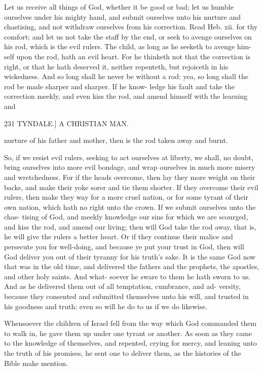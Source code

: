 \documentclass{custom}
\begin{document}
{Let us receive all things of God, whether it be good or 
bad; let us humble ourselves under his mighty hand, and 
submit ourselves unto his nurture and chastising, and not 
withdraw ourselves from his correction. Read Heb. xii.
for thy comfort; and let us not take the staff by the end, 
or seek to avenge ourselves on his rod, which is the evil 
rulers. The child, as long as he seeketh to avenge him- 
self upon the rod, hath an evil heart. For he thinketh 
not that the correction is right, or that he hath deserved it, 
neither repenteth, but rejoiceth in his wickedness. And 
so long shall he never be without a rod: yea, so long 
shall the rod be made sharper and sharper. If he know- 
ledge his fault and take the correction meekly, and even 
kiss the rod, and amend himself with the learning and 


231 
TYNDALE.]
A CHRISTIAN MAN.

nurture of his father and mother, then is the rod taken
away and burnt. 

So, if we resist evil rulers, seeking to act ourselves at 
liberty, we shall, no doubt, bring ourselves into more 
evil bondage, and wrap ourselves in much more misery 
and wretchedness. For if the heads overcome, then 
lay they more weight on their backs, and make their 
yoke sorer and tie them shorter. If they overcome their 
evil rulers, then make they way for a more cruel nation, or 
for some tyrant of their own nation, which hath no right 
unto the crown. If we submit ourselves unto the chas- 
tising of God, and meekly knowledge our sins for which 
we are scourged, and kiss the rod, and amend our living;
then will God take the rod away, that is, he will give the 
rulers a better heart. Or if they continue their malice 
and persecute you for well-doing, and because ye put your 
trust in God, then will God deliver you out of their 
tyranny for his truth's sake. It is the same God now that 
was in the old time, and delivered the fathers and the 
prophets, the apostles, and other holy saints. And what- 
soever he sware to them he hath sworn to us. And as he 
delivered them out of all temptation, cumbrance, and ad- 
versity, because they consented and submitted themselves 
unto his will, and trusted in his goodness and truth: even 
so will he do to us if we do likewise. 

Whensoever the children of Israel fell from the way 
which God commanded them to walk in, he gave them up 
under one tyrant or another. As soon as they came to the 
knowledge of themselves, and repented, crying for mercy, 
and leaning unto the truth of his promises, he sent one to 
deliver them, as the histories of the Bible make mention.

}
\end{document}
